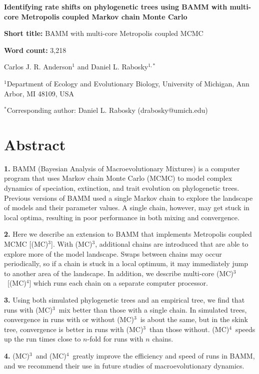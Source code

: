 \documentclass[12pt]{article}
\newcommand{\MCMCMC}{(MC)$^{3}$}
\newcommand{\MCMCMCMC}{(MC)$^{4}$}
\begin{document}
\baselineskip 24pt

\begin{flushleft}

{\Large\textbf{Identifying rate shifts on phylogenetic trees using BAMM
    with multi-core Metropolis coupled Markov chain Monte Carlo}}

\textbf{Short title:} BAMM with multi-core Metropolis coupled MCMC

\textbf{Word count:} 3,218

Carlos J. R. Anderson$^{1}$ and
Daniel L. Rabosky$^{1,*}$

$^{1}$Department of Ecology and Evolutionary Biology,
    University of Michigan, Ann Arbor, MI 48109, USA

$^{*}$Corresponding author: Daniel L. Rabosky (drabosky@umich.edu)

\end{flushleft}


\pagebreak[4]


\section*{Abstract}

{\setlength{\parindent}{0cm}

\textbf{1.}
BAMM (Bayesian Analysis of Macroevolutionary Mixtures) is a computer program
that uses Markov chain Monte Carlo (MCMC) to model complex dynamics
of speciation, extinction, and trait evolution on phylogenetic trees.
%
Previous versions of BAMM used a single Markov chain
to explore the landscape of models and their parameter values.
%
A single chain, however, may get stuck in local optima,
resulting in poor performance in both mixing and convergence.

\textbf{2.}
Here we describe an extension to BAMM
that implements Metropolis coupled MCMC [\MCMCMC].
%
With \MCMCMC, additional chains are introduced
that are able to explore more of the model landscape.
%
Swaps between chains may occur periodically,
so if a chain is stuck in a local optimum,
it may immediately jump to another area of the landscape.
%
In addition, we describe multi-core \MCMCMC\ [\MCMCMCMC]
which runs each chain on a separate computer processor.

\textbf{3.}
Using both simulated phylogenetic trees and an empirical tree,
we find that runs with \MCMCMC\ mix better than those with a single chain.
%
In simulated trees, convergence in runs with or without \MCMCMC\ 
is about the same, but in the skink tree,
convergence is better in runs with \MCMCMC\ than those without.
%
\MCMCMCMC\ speeds up the run times close to $n$-fold
for runs with $n$ chains.

\textbf{4.}
\MCMCMC\ and \MCMCMCMC\ greatly improve
the efficiency and speed of runs in BAMM,
and we recommend their use in future studies of macroevolutionary dynamics.
}
\end{document}
